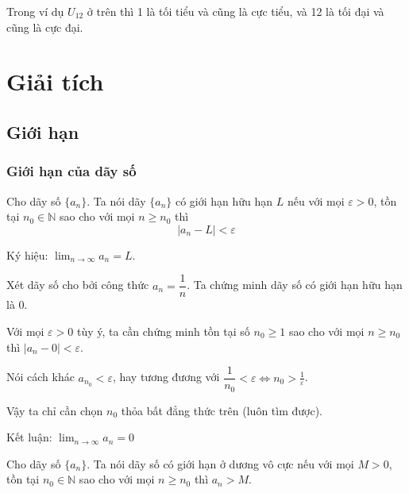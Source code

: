 \documentclass{mynotes}
\newcommand{\NN}{\mathbb{N}}
\begin{document}
Trong ví dụ $U_{12}$ ở trên thì 1 là tối tiểu và cũng là cực tiểu, và 12 là tối đại và cũng là cực đại.



\chapter{Giải tích}

\section{Giới hạn}

\subsection*{Giới hạn của dãy số}

\begin{definition}
    Cho dãy số $\{ a_n \}$. Ta nói dãy $\{ a_n \}$ có giới hạn hữu hạn $L$ nếu với mọi $\varepsilon > 0$, tồn tại $n_0 \in \NN$ sao cho với mọi $n \geqslant n_0$ thì 
    \begin{equation*}
        | a_{n} - L | < \varepsilon
    \end{equation*}

    Ký hiệu: $\displaystyle{\lim_{n \to \infty} a_n = L}$.
\end{definition}

\begin{example}
    Xét dãy số cho bởi công thức $a_n = \dfrac{1}{n}$. Ta chứng minh dãy số có giới hạn hữu hạn là 0.

    Với mọi $\varepsilon > 0$ tùy ý, ta cần chứng minh tồn tại số $n_0 \geqslant 1$ sao cho với mọi $n \geqslant n_0$ thì $| a_n - 0 | < \varepsilon$.

    Nói cách khác $a_{n_0} < \varepsilon$, hay tương đương với $\dfrac{1}{n_0} < \varepsilon \Leftrightarrow n_0 > \frac{1}{\varepsilon}$.

    Vậy ta chỉ cần chọn $n_0$ thỏa bất đẳng thức trên (luôn tìm được).

    Kết luận: $\displaystyle{\lim_{n \to \infty} a_n = 0}$
\end{example}

\begin{definition}
    Cho dãy số $\{a_n\}$. Ta nói dãy số có giới hạn ở dương vô cực nếu với mọi $M > 0$, tồn tại $n_0 \in \NN$ sao cho với mọi $n \geqslant n_0$ thì $a_n > M$.
\end{definition}
\end{document}
